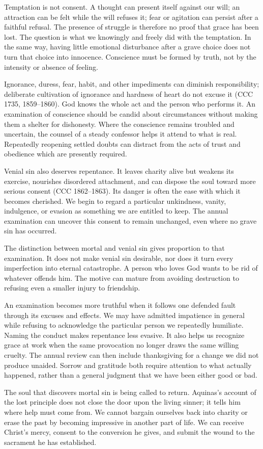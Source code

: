 Temptation is not consent. A thought can present itself against our will; an attraction can be felt while the will refuses it; fear or agitation can persist after a faithful refusal. The presence of struggle is therefore no proof that grace has been lost. The question is what we knowingly and freely did with the temptation. In the same way, having little emotional disturbance after a grave choice does not turn that choice into innocence. Conscience must be formed by truth, not by the intensity or absence of feeling.

Ignorance, duress, fear, habit, and other impediments can diminish responsibility; deliberate cultivation of ignorance and hardness of heart do not excuse it (CCC 1735, 1859--1860). God knows the whole act and the person who performs it. An examination of conscience should be candid about circumstances without making them a shelter for dishonesty. Where the conscience remains troubled and uncertain, the counsel of a steady confessor helps it attend to what is real. Repeatedly reopening settled doubts can distract from the acts of trust and obedience which are presently required.

Venial sin also deserves repentance. It leaves charity alive but weakens its exercise, nourishes disordered attachment, and can dispose the soul toward more serious consent (CCC 1862--1863). Its danger is often the ease with which it becomes cherished. We begin to regard a particular unkindness, vanity, indulgence, or evasion as something we are entitled to keep. The annual examination can uncover this consent to remain unchanged, even where no grave sin has occurred.

The distinction between mortal and venial sin gives proportion to that examination. It does not make venial sin desirable, nor does it turn every imperfection into eternal catastrophe. A person who loves God wants to be rid of whatever offends him. The motive can mature from avoiding destruction to refusing even a smaller injury to friendship.

An examination becomes more truthful when it follows one defended fault through its excuses and effects. We may have admitted impatience in general while refusing to acknowledge the particular person we repeatedly humiliate. Naming the conduct makes repentance less evasive. It also helps us recognize grace at work when the same provocation no longer draws the same willing cruelty. The annual review can then include thanksgiving for a change we did not produce unaided. Sorrow and gratitude both require attention to what actually happened, rather than a general judgment that we have been either good or bad.

The soul that discovers mortal sin is being called to return. Aquinas's account of the lost principle does not close the door upon the living sinner; it tells him where help must come from. We cannot bargain ourselves back into charity or erase the past by becoming impressive in another part of life. We can receive Christ's mercy, consent to the conversion he gives, and submit the wound to the sacrament he has established.

